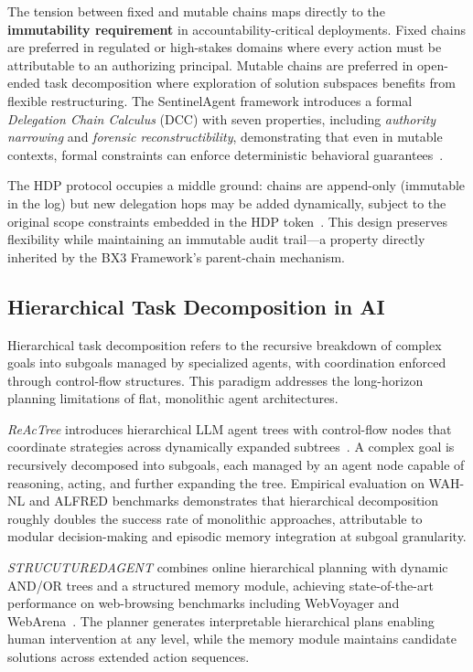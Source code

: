 The tension between fixed and mutable chains maps directly to the \textbf{immutability requirement} in accountability-critical deployments. Fixed chains are preferred in regulated or high-stakes domains where every action must be attributable to an authorizing principal. Mutable chains are preferred in open-ended task decomposition where exploration of solution subspaces benefits from flexible restructuring. The SentinelAgent framework introduces a formal \textit{Delegation Chain Calculus} (DCC) with seven properties, including \textit{authority narrowing} and \textit{forensic reconstructibility}, demonstrating that even in mutable contexts, formal constraints can enforce deterministic behavioral guarantees~\cite{arXiv2604.02767}.

The HDP protocol occupies a middle ground: chains are append-only (immutable in the log) but new delegation hops may be added dynamically, subject to the original scope constraints embedded in the HDP token~\cite{ietf-hdp-2026}. This design preserves flexibility while maintaining an immutable audit trail---a property directly inherited by the BX3 Framework's parent-chain mechanism.

\subsection{Hierarchical Task Decomposition in AI}
\label{sec:hierarchical-task-decomposition}

Hierarchical task decomposition refers to the recursive breakdown of complex goals into subgoals managed by specialized agents, with coordination enforced through control-flow structures. This paradigm addresses the long-horizon planning limitations of flat, monolithic agent architectures.

\textit{ReAcTree} introduces hierarchical LLM agent trees with control-flow nodes that coordinate strategies across dynamically expanded subtrees~\cite{arXiv2511.02424}. A complex goal is recursively decomposed into subgoals, each managed by an agent node capable of reasoning, acting, and further expanding the tree. Empirical evaluation on WAH-NL and ALFRED benchmarks demonstrates that hierarchical decomposition roughly doubles the success rate of monolithic approaches, attributable to modular decision-making and episodic memory integration at subgoal granularity.

\textit{STRUCUTUREDAGENT} combines online hierarchical planning with dynamic AND/OR trees and a structured memory module, achieving state-of-the-art performance on web-browsing benchmarks including WebVoyager and WebArena~\cite{arXiv2603.05294v1}. The planner generates interpretable hierarchical plans enabling human intervention at any level, while the memory module maintains candidate solutions across extended action sequences.

